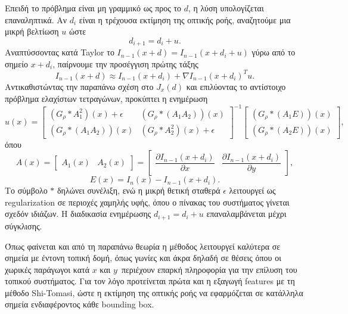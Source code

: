 \documentclass[12pt, a4paper]{article}
\begin{document}
Επειδή το πρόβλημα είναι μη γραμμικό ως προς το $d$, η λύση υπολογίζεται επαναληπτικά. Αν $d_i$ είναι η τρέχουσα εκτίμηση της οπτικής ροής, αναζητούμε μια μικρή βελτίωση $u$ ώστε
\begin{equation}
d_{i+1}=d_i+u.
\end{equation}
Αναπτύσσοντας κατά Taylor το $I_{n-1}(x+d)=I_{n-1}(x+d_i+u)$ γύρω από το σημείο $x+d_i$, παίρνουμε την προσέγγιση πρώτης τάξης
\begin{equation}
I_{n-1}(x+d)\approx I_{n-1}(x+d_i)+\nabla I_{n-1}(x+d_i)^T u.
\end{equation}
Αντικαθιστώντας την παραπάνω σχέση στο $J_x(d)$ και επιλύοντας το αντίστοιχο πρόβλημα ελαχίστων τετραγώνων, προκύπτει η ενημέρωση
\begin{equation}
u(x)=
\begin{bmatrix}
(G_\rho \ast A_1^2)(x)+\epsilon & (G_\rho \ast (A_1A_2))(x) \\
(G_\rho \ast (A_1A_2))(x) & (G_\rho \ast A_2^2)(x)+\epsilon
\end{bmatrix}^{-1}
\begin{bmatrix}
(G_\rho \ast (A_1E))(x) \\
(G_\rho \ast (A_2E))(x)
\end{bmatrix},
\end{equation}
όπου
\begin{equation}
A(x)=\begin{bmatrix}A_1(x) & A_2(x)\end{bmatrix}
=
\begin{bmatrix}
\dfrac{\partial I_{n-1}(x+d_i)}{\partial x} &
\dfrac{\partial I_{n-1}(x+d_i)}{\partial y}
\end{bmatrix},
\end{equation}
\begin{equation}
E(x)=I_n(x)-I_{n-1}(x+d_i).
\end{equation}
Το σύμβολο $\ast$ δηλώνει συνέλιξη, ενώ η μικρή θετική σταθερά $\epsilon$ λειτουργεί ως regularization σε περιοχές χαμηλής υφής, όπου ο πίνακας του συστήματος γίνεται σχεδόν ιδιάζων. Η διαδικασία ενημέρωσης $d_{i+1}=d_i+u$ επαναλαμβάνεται μέχρι σύγκλισης.

Όπως φαίνεται και από τη παραπάνω θεωρία  η μέθοδος λειτουργεί καλύτερα σε σημεία με έντονη τοπική δομή, όπως γωνίες και άκρα δηλαδή σε θέσεις όπου  οι χωρικές παράγωγοι κατά $x$ και $y$\
περιέχουν επαρκή πληροφορία για την επίλυση του τοπικού συστήματος. Για τον λόγο προτείνεται πρώτα και η  εξαγωγή features με τη μέθοδο Shi-Tomasi, ώστε η εκτίμηση της οπτικής ροής να εφαρμόζεται σε κατάλληλα σημεία ενδιαφέροντος  κάθε bounding box.
\end{document}
